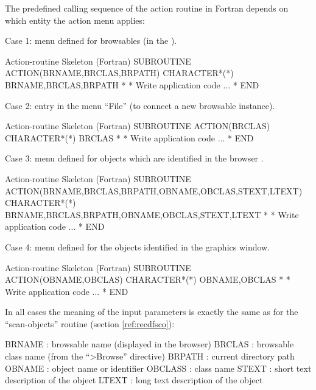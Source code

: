 The predefined calling sequence of the action routine in Fortran depends on 
which entity the action menu applies:
\begin{UL}
\item[]
Case 1: menu defined for browsables (in the \BW{}).
\begin{XMPt} {Action-routine Skeleton (Fortran)}
      SUBROUTINE ACTION(BRNAME,BRCLAS,BRPATH)
      CHARACTER*(*) BRNAME,BRCLAS,BRPATH
*
*     Write application code ... 
*
      END
\end{XMPt}
\item[]
Case 2: entry in the menu ``File'' (to connect a new browsable instance).
\begin{XMPt} {Action-routine Skeleton (Fortran)}
      SUBROUTINE ACTION(BRCLAS)
      CHARACTER*(*) BRCLAS
*
*     Write application code ...
*
      END
\end{XMPt}
\item[]
Case 3: menu defined for objects which are identified in the browser \OW{}.
\begin{XMPt} {Action-routine Skeleton (Fortran)}
      SUBROUTINE ACTION(BRNAME,BRCLAS,BRPATH,OBNAME,OBCLAS,STEXT,LTEXT)
      CHARACTER*(*) BRNAME,BRCLAS,BRPATH,OBNAME,OBCLAS,STEXT,LTEXT
*
*     Write application code ...
*
      END
\end{XMPt}
\item[]
Case 4: menu defined for the objects identified in the graphics window.
\begin{XMPt} {Action-routine Skeleton (Fortran)}
      SUBROUTINE ACTION(OBNAME,OBCLAS)
      CHARACTER*(*) OBNAME,OBCLAS
*
*     Write application code ...
*
      END
\end{XMPt}
\end{UL}
In all cases the meaning of the input parameters is exactly the same as for
the ``scan-objects'' routine (section \ref{ref:recdfsco}):
\begin{XMP}
      BRNAME  : browsable name (displayed in the browser)
      BRCLAS  : browsable class name (from the ``>Browse'' directive)
      BRPATH  : current directory path
      OBNAME  : object name or identifier
      OBCLASS : class name
      STEXT   : short text description of the object
      LTEXT   : long text description of the object
\end{XMP}

